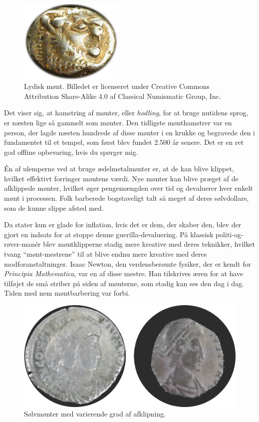\documentclass[paper=6in:9in,pagesize=pdftex,
               headinclude=on,footinclude=on,12pt]{scrbook}
\begin{document}
\begin{figure}
  \centering
  \includegraphics[width=5cm]{assets/images/lydian-coin-stater.png}
  \caption{Lydisk mønt. Billedet er licenseret under Creative Commons Attribution Share-Alike 4.0 af Classical Numismatic Group, Inc.}
  \label{fig:lydian-coin-stater}
\end{figure}

Det viser sig, at hamstring af mønter, eller \textit{hodling}, for at bruge nutidens sprog, er næsten lige så gammelt som mønter. Den tidligste mønthamstrer var en person, der lagde næsten hundrede af disse mønter i en krukke og begravede den i fundamentet til et tempel, som først blev fundet 2.500 år senere. Det er en ret god offline opbevaring, hvis du spørger mig.

Én af ulemperne ved at bruge ædelmetalmønter er, at de kan blive klippet, hvilket effektivt forringer møntens værdi. Nye mønter kan blive præget af de afklippede mønter, hvilket øger pengemængden over tid og devaluerer hver enkelt mønt i processen. Folk barberede bogstaveligt talt så meget af deres sølvdollars, som de kunne slippe afsted med.

Da stater kun er glade for inflation, hvis det er dem, der skaber den, blev der gjort en indsats for at stoppe denne guerilla-devaluering. På klassisk politi-og-røver-man\'er blev møntklipperne stadig mere kreative med deres teknikker, hvilket tvang \enquote{mønt-mestrene} til at blive endnu mere kreative med deres modforanstaltninger. Isaac Newton, den verdensberømte fysiker, der er kendt for \textit{Principia Mathematica}, var en af disse mestre. Han tilskrives æren for at have tilføjet de små striber på siden af mønterne, som stadig kan ses den dag i dag. Tiden med nem møntbarbering var forbi.\begin{figure}
  \includegraphics{assets/images/clipped-coins.png}
  \caption{Sølvmønter med varierende grad af afklipning.}
  \label{fig:clipped-coins}
\end{figure}
\end{document}
